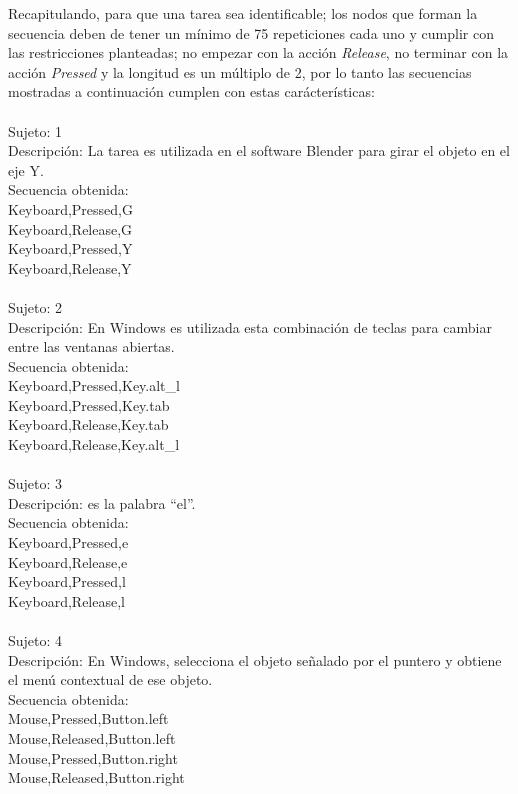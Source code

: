 Recapitulando, para que una tarea sea identificable; los nodos que forman la
 secuencia deben de tener un m\'inimo de 75 repeticiones cada uno y cumplir 
 con las restricciones planteadas; no empezar con la acci\'on \emph{Release}, 
 no terminar con la acci\'on \emph{Pressed} y la longitud es un m\'ultiplo de 
 2, por lo tanto las secuencias mostradas a continuaci\'on cumplen con estas 
 car\'acter\'isticas:
\\
\\
Sujeto: 1	\\
Descripci\'on: La tarea es utilizada en el software Blender para girar el 
 objeto en el eje Y.	\\
Secuencia obtenida:\\
Keyboard,Pressed,G\\
Keyboard,Release,G\\
Keyboard,Pressed,Y\\
Keyboard,Release,Y\\
\\
Sujeto: 2	\\
Descripci\'on: En Windows es utilizada esta combinaci\'on de teclas para 
 cambiar entre las ventanas abiertas.	\\
Secuencia obtenida:\\
Keyboard,Pressed,Key.alt\_l	\\
Keyboard,Pressed,Key.tab	\\
Keyboard,Release,Key.tab	\\
Keyboard,Release,Key.alt\_l	\\
\\
Sujeto: 3	\\
Descripci\'on: es la palabra ``el''.	\\
Secuencia obtenida:\\
Keyboard,Pressed,e	\\
Keyboard,Release,e	\\
Keyboard,Pressed,l	\\
Keyboard,Release,l	\\
\\
Sujeto: 4	\\
Descripci\'on: En Windows, selecciona el objeto se\~nalado por el puntero y
 obtiene el men\'u contextual de ese objeto.	\\
Secuencia obtenida:\\	
Mouse,Pressed,Button.left	\\
Mouse,Released,Button.left	\\
Mouse,Pressed,Button.right	\\
Mouse,Released,Button.right	\\
